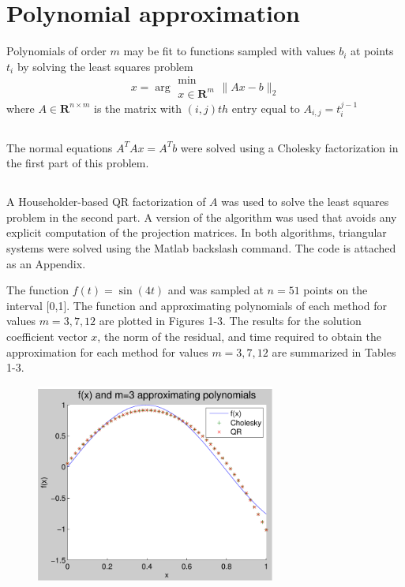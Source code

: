 \documentclass[11pt]{article} %
\begin{document}
\section{Polynomial approximation}
Polynomials of order $m$ may be fit to functions sampled with values $b_i$ at points $t_i$  by solving the least squares problem
\begin{equation}
x = \arg \substack{\min \\x \in \mathbf{R}^{m}} \| Ax -b\|_{2}
\end{equation}
where $A \in \mathbf{R}^{n \times m}$ is the matrix with $(i,j)th$ entry equal to $A_{i,j}=t_i^{j-1}$
\subsection{} %
The normal equations $A^T A x = A^T b$ were solved using a Cholesky factorization in the first part of this problem.
\subsection{} %
A Householder-based QR factorization of $A$ was used to solve the least squares problem in the second part. A version of the algorithm was used that avoids any explicit computation of the projection matrices. In both algorithms, triangular systems were solved using the Matlab backslash command. The code is attached as an Appendix.

The function $f(t) = \sin(4t)$ and was sampled at $n=51$ points on the interval [0,1]. The function and approximating polynomials of each method for values $m=3,7,12$ are plotted in Figures 1-3. The results for the solution coefficient vector $x$, the norm of the residual, and time required to obtain the approximation for each method  for values $m=3,7,12$ are summarized in Tables 1-3.

\begin{figure}[h!]
  \centering
    \includegraphics[width=0.7\textwidth]{p3_m=3}
  \caption{}
\end{figure}
\end{document}
